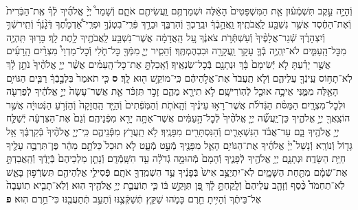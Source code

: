 \documentclass[twoside, openany, parskip=half, 11pt]{book}
\begin{document}
\begin{footnotesize}
\begin{multicols}{2}
\\
וְֿהָיָ֣ה עֵ֣קֶב תִּשְׁמְֿע֗וּן אֵ֤ת הַמִּשְׁפָּטִים֙ הָאֵ֔לֶּה וּשְׁמַרְתֶּ֥ם וַֽעֲשִׂיתֶ֖ם אֹתָ֑ם וְֿשָׁמַר֩ יְיָ֨ אֱלֹהֶ֜יךָ לְֿךָ֗ אֶֽת־הַבְּֿרִית֙ וְֿאֶת־הַחֶ֔סֶד אֲשֶׁ֥ר נִשְׁבַּ֖ע לַֽאֲבֹתֶֽיךָ׃ וַֽאֲהֵ֣בְֿךָ֔ וּבֵֽרַכְךָ֖ וְֿהִרְבֶּ֑ךָ וּבֵרַ֣ךְ פְּֿרִֽי־בִטְנְֿךָ֣ וּפְרִֽי־אַ֠דְמָתֶ֠ךָ דְּֿגָ֨נְֿךָ֜ וְֿתִֽירשְֿׁךָ֣ וְֿיִצְהָרֶ֗ךָ שְֿׁגַר־אֲלָפֶ֨יךָ֙ וְֿעַשְׁתְּֿרֹ֣ת צֹאנֶ֔ךָ עַ֚ל הָֽאֲדָמָ֔ה אֲשֶׁר־נִשְׁבַּ֥ע לַֽאֲבֹתֶ֖יךָ לָ֥תֶת לָֽךְ׃ בָּר֥וּךְ תִּֽהְיֶ֖ה מִכׇּל־הָֽעַמִּ֑ים לֹא־יִֽהְיֶ֥ה בְֿךָ֛ עָקָ֥ר וַֽעֲקָרָ֖ה וּבִבְהֶמְתֶּֽךָ׃ וְֿהֵסִ֧יר יְיָ֛ מִמְּֿךָ֖ כׇּל־חֹ֑לִי וְֿכׇל־מַדְוֵי֩ מִצְרַ֨יִם הָֽרָעִ֜ים אֲשֶׁ֣ר יָדַ֗עְתָּ לֹ֤א יְֿשִׂימָם֙ בָּ֔ךְ וּנְתָנָ֖ם בְּֿכׇל־שֽׂנְאֶֽיךָ׃ וְֿאָֽכַלְתָּ֣ אֶת־כׇּל־הָֽעַמִּ֗ים אֲשֶׁ֨ר יְיָ֤ אֱלֹהֶ֨יךָ֙ נֹתֵ֣ן לָ֔ךְ לֹֽא־תָח֥וֹס עֵֽינְֿךָ֖ עֲלֵיהֶ֑ם וְֿלֹ֤א תַֽעֲבֹד֙ אֶת־אֱלֹ֣הֵיהֶ֔ם כִּֽי־מוֹקֵ֥שׁ ה֖וּא לָֽךְ׃ \textbf{ס} כִּ֤י תֹאמַר֙ בִּלְבָ֣בְֿךָ֔ רַבִּ֛ים הַגּוֹיִ֥ם הָאֵ֖לֶּה מִמֶּ֑נִּי אֵיכָ֥ה אוּכַ֖ל לְֿהֽוֹרִישָֽׁם׃ לֹ֥א תִירָ֖א מֵהֶ֑ם זָכֹ֣ר תִּזְכֹּ֗ר אֵ֤ת אֲשֶׁר־עָשָׂה֙ יְיָ֣ אֱלֹהֶ֔יךָ לְֿפַרְעֹ֖ה וּלְכׇל־מִצְרָֽיִם׃ הַמַּסֹּ֨ת הַגְּֿדֹלֹ֜ת אֲשֶׁר־רָא֣וּ עֵינֶ֗יךָ וְֿהָֽאֹתֹ֤ת וְֿהַמֹּֽפְֿתִים֙ וְֿהַיָּ֤ד הַֽחֲזָקָה֙ וְֿהַזְּֿרֹ֣עַ הַנְּֿטוּיָ֔ה אֲשֶׁ֥ר הוֹצִֽאֲךָ֖ יְיָ֣ אֱלֹהֶ֑יךָ כֵּן־יַֽעֲשֶׂ֞ה יְיָ֤ אֱלֹהֶ֨יךָ֙ לְֿכׇל־הָ֣עַמִּ֔ים אֲשֶׁר־אַתָּ֥ה יָרֵ֖א מִפְּֿנֵיהֶֽם׃ וְֿגַם֙ אֶת־הַצִּרְעָ֔ה יְֿשַׁלַּ֛ח יְיָ֥ אֱלֹהֶ֖יךָ בָּ֑ם עַד־אֲבֹ֗ד הַנִּשְׁאָרִ֛ים וְֿהַנִּסְתָּרִ֖ים מִפָּנֶֽיךָ׃ לֹ֥א תַֽעֲרֹ֖ץ מִפְּֿנֵיהֶ֑ם כִּֽי־יְיָ֤ אֱלֹהֶ֨יךָ֙ בְּֿקִרְבֶּ֔ךָ אֵ֥ל גָּד֖וֹל וְֿנוֹרָֽא׃  וְֿנָשַׁל֩ יְיָ֨ אֱלֹהֶ֜יךָ אֶת־הַגּוֹיִ֥ם הָאֵ֛ל מִפָּנֶ֖יךָ מְֿעַ֣ט מְֿעָ֑ט לֹ֤א תוּכַל֙ כַּלֹּתָ֣ם מַהֵ֔ר פֶּן־תִּרְבֶּ֥ה עָלֶ֖יךָ חַיַּ֥ת הַשָּׂדֶֽה׃ וּנְתָנָ֛ם יְיָ֥ אֱלֹהֶ֖יךָ לְֿפָנֶ֑יךָ וְֿהָמָם֙ מְֿהוּמָ֣ה גְֿדֹלָ֔ה עַ֖ד הִשָּֽׁמְֿדָֽם׃ וְֿנָתַ֤ן מַלְכֵיהֶם֙ בְּֿיָדֶ֔ךָ וְֿהַֽאֲבַדְתָּ֣ אֶת־שְֿׁמָ֔ם מִתַּ֖חַת הַשָּׁמָ֑יִם לֹֽא־יִתְיַצֵּ֥ב אִישׁ֙ בְּֿפָנֶ֔יךָ עַ֥ד הִשְׁמִֽדְךָ֖ אֹתָֽם׃ פְּֿסִילֵ֥י אֱלֹֽהֵיהֶ֖ם תִּשְׂרְֿפ֣וּן בָּאֵ֑שׁ לֹֽא־תַחְמֹד֩ כֶּ֨סֶף וְֿזָהָ֤ב עֲלֵיהֶם֙ וְֿלָֽקַחְתָּ֣ לָ֔ךְ פֶּ֚ן תִּוָּקֵ֣שׁ בּ֔וֹ כִּ֧י תֽוֹעֲבַ֛ת יְיָ֥ אֱלֹהֶ֖יךָ הֽוּא׃ וְֿלֹֽא־תָבִ֤יא תֽוֹעֵבָה֙ אֶל־בֵּיתֶ֔ךָ וְֿהָיִ֥יתָ חֵ֖רֶם כָּמֹ֑הוּ שַׁקֵּ֧ץ תְּֿשַׁקְּֿצֶ֛נּוּ וְֿתַעֵ֥ב תְּֽֿתַעֲבֶ֖נּוּ כִּי־חֵ֥רֶם הֽוּא׃ \textbf{פ}

\end{multicols}
\end{footnotesize}
\end{document}
